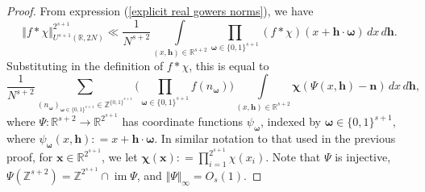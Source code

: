 \documentclass[12pt,a4paper,twoside,reqno]{amsart}
\newcommand{\bo}{\boldsymbol{\omega}}
\newcommand{\bc}{\boldsymbol{\chi}}
\newcommand{\im}{\operatorname{im}}
\numberwithin{equation}{section}
\begin{document}
\begin{proof}
From expression (\ref{explicit real gowers norms}), we have $$\Vert f\ast \chi \Vert _{U^{s+1}(\mathbb{R},2N)}^{2^{s+1}} \ll \frac{1}{N^{s+2}}\int\limits_{(x,\mathbf{h})\in \mathbb{R}^{s+2}}\prod\limits_{\boldsymbol{\omega}\in \{0,1\}^{s+1}} (f\ast \chi)(x+ \mathbf{h}\cdot\boldsymbol{\omega}) \, dx\, d\mathbf{h}.$$ Substituting in the definition of $f\ast \chi$, this is equal to 
\begin{equation}
\label{comparing gowers norms equation}
\frac{1}{N^{s+2}} \sum\limits_{(n_{\boldsymbol{\omega}})_{\boldsymbol{\omega}\in \{0,1\}^{s+1}} \in \mathbb{Z}^{\{0,1\}^{s+1}}} \Big(\prod\limits_{\boldsymbol{\omega} \in\{0,1\}^{s+1}} f(n_{\boldsymbol{\omega}})\Big)\int\limits_{(x,\mathbf{h})\in \mathbb{R}^{s+2}} \boldsymbol{\chi}(\Psi(x,\mathbf{h}) - \mathbf{n}) \, dx \, d\mathbf{h}, 
\end{equation}
where $\Psi:\mathbb{R}^{s+2}\longrightarrow \mathbb{R}^{2^{s+1}}$ has coordinate functions $\psi_{\boldsymbol{\omega}}$, indexed by $\bo \in \{0,1\}^{s+1}$, where $\psi_{\boldsymbol{\omega}}(x,\mathbf{h}) : = x + \mathbf{h} \cdot \bo$. In similar notation to that used in the previous proof, for $\mathbf{x} \in \mathbb{R}^{2^{s+1}}$, we let $\bc(\mathbf{x}) : = \prod_{i=1}^{2^{s+1}} \chi(x_i)$.  Note that $\Psi$ is injective, $\Psi(\mathbb{Z}^{s+2}) = \mathbb{Z}^{2^{s+1}} \cap \im \Psi$, and $\Vert \Psi\Vert_\infty = O_s(1)$.  


\end{proof}
\end{document}
